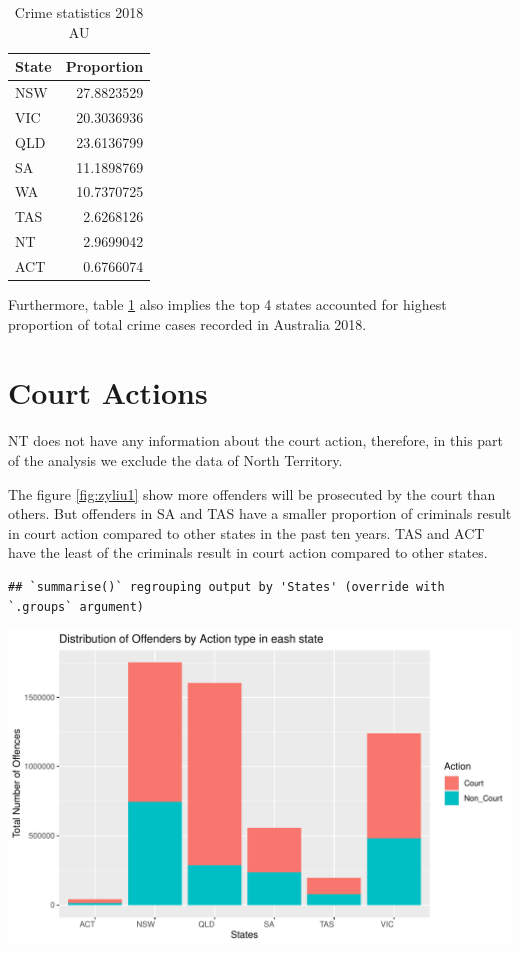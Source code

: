 \documentclass[11pt,a4paper,]{article}
\let\origfigure\figure
\let\endorigfigure\endfigure
\renewenvironment{figure}[1][2] {
\expandafter\origfigure\expandafter[H]
} {
\endorigfigure
}
\begin{document}
\begin{table}

\caption{\label{tab:table}Crime statistics 2018 AU}
\centering
\begin{tabular}[t]{l|r}
\hline
State & Proportion\\
\hline
NSW & 27.8823529\\
\hline
VIC & 20.3036936\\
\hline
QLD & 23.6136799\\
\hline
SA & 11.1898769\\
\hline
WA & 10.7370725\\
\hline
TAS & 2.6268126\\
\hline
NT & 2.9699042\\
\hline
ACT & 0.6766074\\
\hline
\end{tabular}
\end{table}

Furthermore, table \ref{tab:table} also implies the top 4 states accounted for highest proportion of total crime cases recorded in Australia 2018.

\section*{Court Actions}

NT does not have any information about the court action, therefore, in this part of the analysis we exclude the data of North Territory.

The figure \ref{fig:zyliu1} show more offenders will be prosecuted by the court than others. But offenders in SA and TAS have a smaller proportion of criminals result in court action compared to other states in the past ten years. TAS and ACT have the least of the criminals result in court action compared to other states.

\begin{verbatim}
## `summarise()` regrouping output by 'States' (override with `.groups` argument)
\end{verbatim}

\begin{figure}

{\centering \includegraphics{ETC5513-Assignment4_files/figure-latex/zyliu1-1} 

}

\caption{Distribution of Offenders by Action type}\label{fig:zyliu1}
\end{figure}
\end{document}

